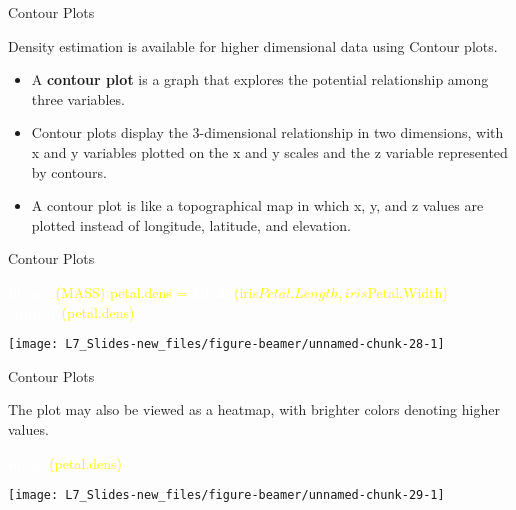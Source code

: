 \documentclass[ignorenonframetext,]{beamer}
\newenvironment{Shaded}{\begin{snugshade}}{\end{snugshade}}
\newcommand{\KeywordTok}[1]{\textcolor{white}{\textbf{{#1}}}}
\newcommand{\NormalTok}[1]{\textcolor{yellow}{{#1}}}
\newcommand{\StringTok}[1]{\textcolor{yellow}{{#1}}}
\begin{document}
\begin{frame}{Contour Plots}

Density estimation is available for higher dimensional data using
Contour plots.

\begin{itemize}
\item
  A \textbf{contour plot} is a graph that explores the potential
  relationship among three variables.
\item
  Contour plots display the 3-dimensional relationship in two
  dimensions, with x and y variables plotted on the x and y scales and
  the z variable represented by contours.
\item
  A contour plot is like a topographical map in which x, y, and z values
  are plotted instead of longitude, latitude, and elevation.
\end{itemize}

\end{frame}

\begin{frame}[fragile]{Contour Plots}

\small

\begin{Shaded}
\begin{Highlighting}[]
\KeywordTok{library}\NormalTok{(MASS)}
\NormalTok{petal.dens =}\StringTok{ }\KeywordTok{kde2d}\NormalTok{(iris$Petal.Length, iris$Petal.Width)}
\KeywordTok{contour}\NormalTok{(petal.dens)}
\end{Highlighting}
\end{Shaded}

\begin{center}\texttt{[image: L7\_Slides-new\_files/figure-beamer/unnamed-chunk-28-1]} \end{center}

\end{frame}

\begin{frame}[fragile]{Contour Plots}

The plot may also be viewed as a heatmap, with brighter colors denoting
higher values. \small

\begin{Shaded}
\begin{Highlighting}[]
\KeywordTok{image}\NormalTok{(petal.dens)}
\end{Highlighting}
\end{Shaded}

\begin{center}\texttt{[image: L7\_Slides-new\_files/figure-beamer/unnamed-chunk-29-1]} \end{center}

\end{frame}
\end{document}
